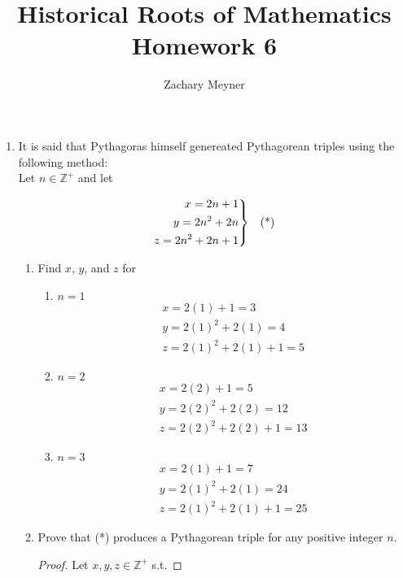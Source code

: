 \documentclass[11pt]{article}
\title{\large Historical Roots of Mathematics Homework 6}
\author{\large Zachary Meyner}
\date{}
\newenvironment{rcases}
                {\left.\begin{aligned}}
                {\end{aligned}\right\rbrace}
\begin{document}
\maketitle

\begin{enumerate}
    \item It is said that Pythagoras himself genereated Pythagorean triples using the following method:\\
    Let $n \in \mathbb{Z}^{+}$ and let 
        
    \begin{align*}
        \begin{rcases}
            x = 2n+1 \\
            y = 2n^2+2n \\
            z=2n^2+2n+1
        \end{rcases}
        &&\text{(*)}
    \end{align*}
    \begin{enumerate}
        \item Find $x$, $y$, and $z$ for
        \begin{enumerate}
            \item $n=1$
            \begin{gather*}
                x=2(1)+1=3 \\
                y=2{(1)}^2+2(1)=4 \\
                z=2{(1)}^2+2(1)+1=5
            \end{gather*}
            \item $n=2$
            \begin{gather*}
                x=2(2)+1=5 \\
                y=2{(2)}^2+2(2)=12 \\
                z=2{(2)}^2+2(2)+1=13
            \end{gather*}
            \item $n=3$
            \begin{gather*}
                x=2(1)+1=7 \\
                y=2{(1)}^2+2(1)=24 \\
                z=2{(1)}^2+2(1)+1=25
            \end{gather*}
        \end{enumerate}
        \item Prove that (*) produces a Pythagorean triple for any positive integer $n$.
        \begin{proof}
            Let $x,y,z \in \mathbb{Z}^{+}$ s.t.

\end{proof}
\end{enumerate}
\end{enumerate}
\end{document}
